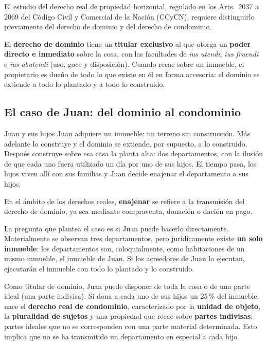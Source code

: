\documentclass[12pt,oneside]{book}
\begin{document}
El estudio del derecho real de propiedad horizontal, regulado en los Arts.~2037 a 2069 del Código Civil y Comercial de la Nación (CCyCN), requiere distinguirlo previamente del derecho de dominio y del derecho de condominio.

El \textbf{derecho de dominio} tiene un \textbf{titular exclusivo} al que otorga un \textbf{poder directo e inmediato} sobre la cosa, con las facultades de \textit{ius utendi}, \textit{ius fruendi} e \textit{ius abutendi} (uso, goce y disposición). Cuando recae sobre un inmueble, el propietario es dueño de todo lo que existe en él en forma accesoria: el dominio se extiende a todo lo plantado y a todo lo construido.

\subsection{El caso de Juan: del dominio al condominio}

\begin{example}{Juan y sus hijos}
Juan adquiere un inmueble: un terreno sin construcción. Más adelante lo construye y el dominio se extiende, por supuesto, a lo construido. Después construye sobre esa casa la planta alta: dos departamentos, con la ilusión de que cada uno fuera utilizado un día por uno de sus hijos. El tiempo pasa, los hijos viven allí con sus familias y Juan decide enajenar el departamento a sus hijos.
\end{example}

En el ámbito de los derechos reales, \textbf{enajenar} se refiere a la transmisión del derecho de dominio, ya sea mediante compraventa, donación o dación en pago.

La pregunta que plantea el caso es si Juan puede hacerlo directamente. Materialmente se observan tres departamentos, pero jurídicamente existe \textbf{un solo inmueble}: los departamentos son, coloquialmente, como habitaciones de un mismo inmueble, el inmueble de Juan. Si los acreedores de Juan lo ejecutan, ejecutarán el inmueble con todo lo plantado y lo construido.

Como titular de dominio, Juan puede disponer de toda la cosa o de una parte ideal (una parte indivisa). Si dona a cada uno de sus hijos un 25\,\% del inmueble, nace el \textbf{derecho real de condominio}, caracterizado por la \textbf{unidad de objeto}, la \textbf{pluralidad de sujetos} y una propiedad que recae sobre \textbf{partes indivisas}: partes ideales que no se corresponden con una parte material determinada. Esto implica que no se ha transmitido un departamento en especial a cada hijo.
\end{document}
